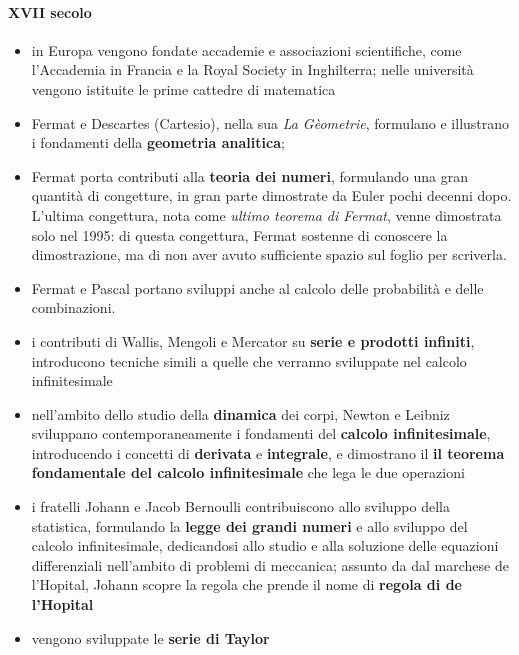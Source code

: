 \paragraph{XVII secolo}
\begin{itemize}
  \item in Europa vengono fondate accademie e associazioni scientifiche, come l'Accademia in Francia e la Royal Society in Inghilterra; nelle università vengono istituite le prime cattedre di matematica
  \item Fermat e Descartes (Cartesio), nella sua \textit{La Gèometrie}, formulano e illustrano i fondamenti della \textbf{geometria analitica};
  \item Fermat porta contributi alla \textbf{teoria dei numeri}, formulando una gran quantità di congetture, in gran parte dimostrate da Euler pochi decenni dopo. L'ultima congettura, nota come \textit{ultimo teorema di Fermat}, venne dimostrata solo nel 1995: di questa congettura, Fermat sostenne di conoscere la dimostrazione, ma di non aver avuto sufficiente spazio sul foglio per scriverla.
  \item Fermat e Pascal portano sviluppi anche al calcolo delle probabilità e delle combinazioni.
  \item i contributi di Wallis, Mengoli e Mercator su \textbf{serie e prodotti infiniti}, introducono tecniche simili a quelle che verranno sviluppate nel calcolo infinitesimale 
  \item nell'ambito dello studio della \textbf{dinamica} dei corpi, Newton e Leibniz sviluppano contemporaneamente i fondamenti del \textbf{calcolo infinitesimale}, introducendo i concetti di \textbf{derivata} e \textbf{integrale}, e dimostrano il \textbf{il teorema fondamentale del calcolo infinitesimale} che lega le due operazioni 
  \item i fratelli Johann e Jacob Bernoulli contribuiscono allo sviluppo della statistica, formulando la \textbf{legge dei grandi numeri} e allo sviluppo del calcolo infinitesimale, dedicandosi allo studio e alla soluzione delle equazioni differenziali nell'ambito di problemi di meccanica; assunto da dal marchese de l'Hopital, Johann scopre la regola che prende il nome di \textbf{regola di de l'Hopital}
  \item vengono sviluppate le \textbf{serie di Taylor} 
\end{itemize}
